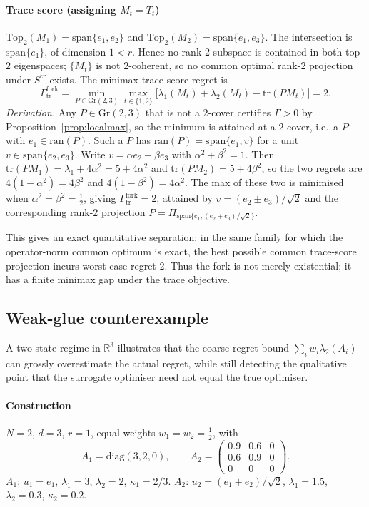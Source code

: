 \documentclass[final,3p,times]{elsarticle}
\newcommand{\Gr}{\mathrm{Gr}}
\newcommand{\tr}{\mathrm{tr}}
\newcommand{\R}{\mathbb{R}}
\newcommand{\ran}{\mathrm{ran}}
\begin{document}
\paragraph{Trace score (assigning $M_t=T_t$)}
$\mathrm{Top}_2(M_1)=\mathrm{span}\{e_1,e_2\}$ and
$\mathrm{Top}_2(M_2)=\mathrm{span}\{e_1,e_3\}$.
The intersection is $\mathrm{span}\{e_1\}$, of dimension $1<r$.
Hence no rank-$2$ subspace is contained in both top-$2$ eigenspaces;
$\{M_t\}$ is not $2$-coherent, so no common optimal rank-$2$ projection
under $S^{\mathrm{tr}}$ exists.
The minimax trace-score regret is
\begin{equation}
\Gamma_{\mathrm{tr}}^{\mathrm{fork}}
=\min_{P\in\Gr(2,3)}\max_{t\in\{1,2\}}
\bigl[\lambda_1(M_t)+\lambda_2(M_t)-\tr(P M_t)\bigr]
=2.
\end{equation}
\emph{Derivation.}
Any $P\in\Gr(2,3)$ that is not a $2$-cover certifies $\Gamma>0$ by
Proposition~\ref{prop:localmax}, so the minimum is attained at a
$2$-cover, i.e.\ a $P$ with $e_1\in\ran(P)$.
Such a $P$ has $\ran(P)=\mathrm{span}\{e_1,v\}$ for a unit
$v\in\mathrm{span}\{e_2,e_3\}$.
Write $v=\alpha e_2+\beta e_3$ with $\alpha^2+\beta^2=1$.
Then $\tr(PM_1)=\lambda_1+4\alpha^2=5+4\alpha^2$ and
$\tr(PM_2)=5+4\beta^2$, so the two regrets are
$4(1-\alpha^2)=4\beta^2$ and $4(1-\beta^2)=4\alpha^2$.
The max of these two is minimised when $\alpha^2=\beta^2=\tfrac{1}{2}$,
giving $\Gamma_{\mathrm{tr}}^{\mathrm{fork}}=2$, attained by
$v=(e_2\pm e_3)/\sqrt 2$ and the corresponding rank-$2$ projection
$P=\Pi_{\mathrm{span}\{e_1,(e_2+e_3)/\sqrt{2}\}}$.

\noindent
This gives an exact quantitative separation: in the same family for
which the operator-norm common optimum is exact, the best possible
common trace-score projection incurs worst-case regret $2$.
Thus the fork is not merely existential; it has a finite minimax gap
under the trace objective.

\subsection{Weak-glue counterexample}

A two-state regime in $\R^3$ illustrates that the coarse regret bound
$\sum_i w_i\lambda_2(A_i)$ can grossly overestimate the actual regret,
while still detecting the qualitative point that the surrogate
optimiser need not equal the true optimiser.

\paragraph{Construction}
$N=2$, $d=3$, $r=1$, equal weights $w_1=w_2=\tfrac{1}{2}$, with
\begin{equation}\label{eq:wgex}
A_1=\mathrm{diag}(3,2,0),\qquad
A_2=\begin{pmatrix} 0.9 & 0.6 & 0\\ 0.6 & 0.9 & 0\\ 0 & 0 & 0\end{pmatrix}.
\end{equation}
$A_1$: $u_1=e_1$, $\lambda_1=3$, $\lambda_2=2$, $\kappa_1=2/3$.
$A_2$: $u_2=(e_1+e_2)/\sqrt 2$, $\lambda_1=1.5$, $\lambda_2=0.3$,
$\kappa_2=0.2$.
\end{document}
